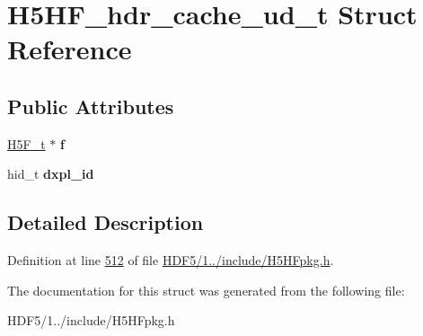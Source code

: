 \hypertarget{struct_h5_h_f__hdr__cache__ud__t}{}\section{H5\+H\+F\+\_\+hdr\+\_\+cache\+\_\+ud\+\_\+t Struct Reference}
\label{struct_h5_h_f__hdr__cache__ud__t}
\subsection*{Public Attributes}
\begin{DoxyCompactItemize}
\item 
\mbox{\label{struct_h5_h_f__hdr__cache__ud__t_aaf2fed274d1e0a10357cde3510e0c9f6}} 
\hyperlink{struct_h5_f__t}{H5\+F\+\_\+t} $\ast$ {\bfseries f}
\item 
\mbox{\label{struct_h5_h_f__hdr__cache__ud__t_a118dc04e9dbbc1fa57b89e18e3b8dd80}} 
hid\+\_\+t {\bfseries dxpl\+\_\+id}
\end{DoxyCompactItemize}


\subsection{Detailed Description}


Definition at line \hyperlink{_h_d_f5_21_810_81_2include_2_h5_h_fpkg_8h_source_l00512}{512} of file \hyperlink{_h_d_f5_21_810_81_2include_2_h5_h_fpkg_8h_source}{H\+D\+F5/1../include/\+H5\+H\+Fpkg.\+h}.



The documentation for this struct was generated from the following file\+:\begin{DoxyCompactItemize}
\item 
H\+D\+F5/1../include/\+H5\+H\+Fpkg.\+h\end{DoxyCompactItemize}
